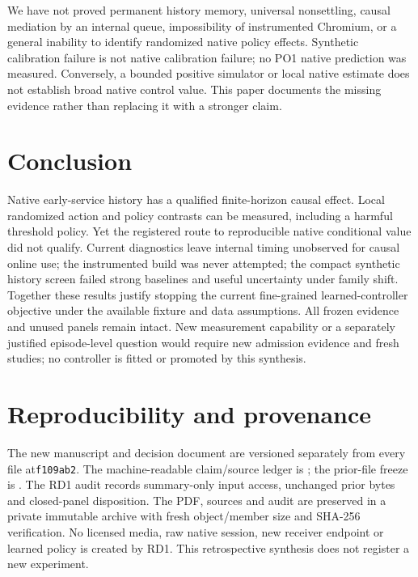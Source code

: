\documentclass[10pt]{article}
\begin{document}
We have not proved permanent history memory, universal nonsettling, causal
mediation by an internal queue, impossibility of instrumented Chromium, or a
general inability to identify randomized native policy effects. Synthetic
calibration failure is not native calibration failure; no PO1 native prediction
was measured. Conversely, a bounded positive simulator or local native estimate
does not establish broad native control value. This paper documents the missing
evidence rather than replacing it with a stronger claim.

\section{Conclusion}
Native early-service history has a qualified finite-horizon causal effect.
Local randomized action and policy contrasts can be measured, including a
harmful threshold policy. Yet the registered route to reproducible native
conditional value did not qualify. Current diagnostics leave internal timing
unobserved for causal online use; the instrumented build was never attempted;
the compact synthetic history screen failed strong baselines and useful
uncertainty under family shift. Together these results justify stopping the
current fine-grained learned-controller objective under the available fixture
and data assumptions. All frozen evidence and unused panels remain intact.
New measurement capability or a separately justified episode-level question
would require new admission evidence and fresh studies; no controller is fitted
or promoted by this synthesis.

\appendix
\section{Reproducibility and provenance}
The new manuscript and decision document are versioned separately from every
file at\texttt{f109ab2}. The machine-readable claim/source ledger is
; the prior-file freeze is
. The RD1 audit records
summary-only input access, unchanged prior bytes and closed-panel disposition.
The PDF, sources and audit are preserved in a private immutable archive with
fresh object/member size and SHA-256 verification. No licensed media, raw
native session, new receiver endpoint or learned policy is created by RD1.
This retrospective synthesis does not register a new experiment.


\end{document}
